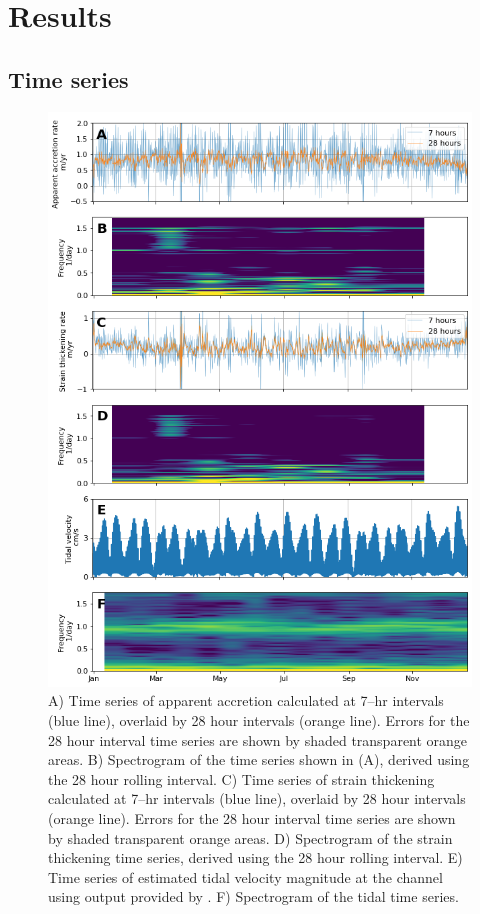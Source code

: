\section{Results } \label{sec:apres_results}

\subsection{Time series}

\begin{figure}[!ht]
\centering
\includegraphics[width=0.85
\textwidth]{chapters/3/alltimeseries.png}
\caption[Time series]{A) Time series of apparent accretion calculated at 7--hr intervals (blue line), overlaid by 28 hour intervals (orange line). Errors for the 28 hour interval time series are shown by shaded transparent orange areas. B) Spectrogram of the time series shown in (A), derived using the 28 hour rolling interval. C) Time series of strain thickening calculated at 7--hr intervals (blue line), overlaid by 28 hour intervals (orange line). Errors for the 28 hour interval time series are shown by shaded transparent orange areas. D)  Spectrogram of the strain thickening time series, derived using the 28 hour rolling interval. E) Time series of estimated tidal velocity magnitude at the channel using output provided by \cite{padman2002new}. F) Spectrogram of the tidal time series.
}
\label{fig:alltimeseries}
\end{figure}


